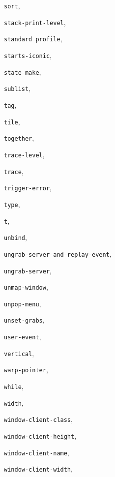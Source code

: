 \begin{theindex}
\item {\tt sort}, {\bf\pageref{sort}}
\item {\tt stack-print-level}, {\bf\pageref{stack-print-level}}
\item {\tt standard profile}, {\bf\pageref{standard-profile}}
\item {\tt starts-iconic}, {\bf\pageref{starts-iconic}}
\item {\tt state-make}, {\bf\pageref{state-make}}
\item {\tt sublist}, {\bf\pageref{sublist}}
\item {\tt tag}, {\bf\pageref{tag}}
\item {\tt tile}, {\bf\pageref{tile}}
\item {\tt together}, {\bf\pageref{together}}
\item {\tt trace-level}, {\bf\pageref{trace-level}}
\item {\tt trace}, {\bf\pageref{trace}}
\item {\tt trigger-error}, {\bf\pageref{trigger-error}}
\item {\tt type}, {\bf\pageref{type}}
\item {\tt t}, {\bf\pageref{t}}
\item {\tt unbind}, {\bf\pageref{unbind}}
\item {\tt ungrab-server-and-replay-event}, {\bf\pageref{ungrab-server-and-replay-event}}
\item {\tt ungrab-server}, {\bf\pageref{ungrab-server}}
\item {\tt unmap-window}, {\bf\pageref{unmap-window}}
\item {\tt unpop-menu}, {\bf\pageref{unpop-menu}}
\item {\tt unset-grabs}, {\bf\pageref{unset-grabs}}
\item {\tt user-event}, {\bf\pageref{user-event}}
\item {\tt vertical}, {\bf\pageref{vertical}}
\item {\tt warp-pointer}, {\bf\pageref{warp-pointer}}
\item {\tt while}, {\bf\pageref{while}}
\item {\tt width}, {\bf\pageref{width}}
\item {\tt window-client-class}, {\bf\pageref{window-client-class}}
\item {\tt window-client-height}, {\bf\pageref{window-client-height}}
\item {\tt window-client-name}, {\bf\pageref{window-client-name}}
\item {\tt window-client-width}, {\bf\pageref{window-client-width}}

\end{theindex}
